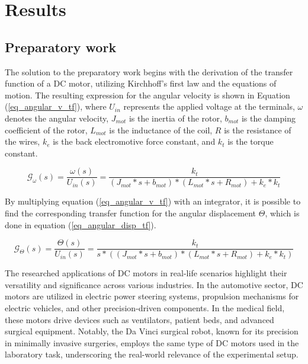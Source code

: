 \newpage
\section{Results}

\subsection{Preparatory work}

The solution to the preparatory work begins with the derivation of the transfer function of a DC motor, 
utilizing Kirchhoff's first law and the equations of motion. The resulting expression for the angular 
velocity is shown in Equation (\ref{eq_angular_v_tf}), where $U_{in}$ represents the applied voltage at the 
terminals, $\omega$ denotes the angular velocity, $J_{mot}$ is the inertia of the rotor, $b_{mot}$ is the 
damping coefficient of the rotor, $L_{mot}$ is the inductance of the coil, $R$ is the resistance of the 
wires, $k_e$ is the back electromotive force constant, and $k_t$ is the torque constant.

\begin{equation}
    \mathcal{G}_{\omega}(s)=\frac{\omega (s)}{U_{in}(s)} = \frac{k_t}{(J_{mot}*s+b_{mot})*(L_{mot}*s+R_{mot})+k_e*k_t}
    \label{eq_angular_v_tf}
\end{equation}

By multiplying equation (\ref{eq_angular_v_tf}) with an integrator, it is possible to find the corresponding 
transfer function for the angular displacement $\Theta$, which is done in equation (\ref{eq_angular_disp_tf}).

\begin{equation}
    \mathcal{G}_{\Theta}(s) = \frac{\Theta (s)}{U_{in}(s)} = \frac{k_t}{s*((J_{mot}*s+b_{mot})*(L_{mot}*s+R_{mot})+k_e*k_t)}
    \label{eq_angular_disp_tf}
\end{equation}

The researched applications of DC motors in real-life scenarios highlight their versatility and significance 
across various industries. In the automotive sector, DC motors are utilized in electric power steering systems, 
propulsion mechanisms for electric vehicles, and other precision-driven components. In the medical field, these 
motors drive devices such as ventilators, patient beds, and advanced surgical equipment. Notably, the Da Vinci 
surgical robot, known for its precision in minimally invasive surgeries, employs the same type of DC motors used 
in the laboratory task, underscoring the real-world relevance of the experimental setup.

